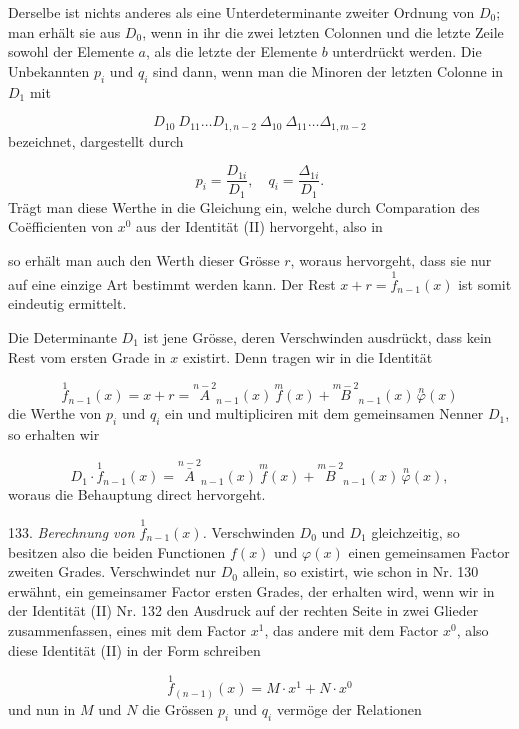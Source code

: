 Derselbe ist nichts anderes als eine Unterdeterminante zweiter Ordnung von $D_0$; man erhält sie aus $D_0$, wenn in ihr die zwei letzten Colonnen und die letzte Zeile sowohl der Elemente $a$, als die letzte der Elemente $b$ unterdrückt werden. Die Unbekannten $p_i$ und $q_i$ sind dann, wenn man die Minoren der letzten Colonne in $D_1$ mit

\[
D_{10}\ D_{11} \ldots D_{1,n-2}\ \Delta_{10}\ \Delta_{11} \ldots \Delta_{1,m-2}
\]
bezeichnet, dargestellt durch

\[
p_i = \frac{D_{1i}}{D_1},\quad q_i = \frac{\Delta_{1i}}{D_1}.
\]
Trägt man diese Werthe in die Gleichung ein, welche durch Comparation des Co\"efficienten von $x^0$ aus der Identität (II) hervorgeht, also in


so erhält man auch den Werth dieser Grösse $r$, woraus hervorgeht, dass sie nur auf eine einzige Art bestimmt werden kann. Der Rest $x + r = \overset{1}{f}_{n-1}(x)$ ist somit eindeutig ermittelt.



Die Determinante $D_1$ ist jene Grösse, deren Verschwinden ausdrückt, dass kein Rest vom ersten Grade in $x$ existirt. Denn tragen wir in die Identität

\[
\overset{1}{f}_{n-1}(x) = x + r = \overset{n-2}{A}_{n-1}(x)\,\overset{m}{f}(x) + \overset{m-2}{B}_{n-1}(x)\,\overset{n}{\varphi}(x)
\]
die Werthe von $p_i$ und $q_i$ ein und multipliciren mit dem gemeinsamen Nenner $D_1$, so erhalten wir

\[
D_1 \cdot \overset{1}{f}_{n-1}(x) = \overset{n-2}{\bar A}_{n-1}(x)\,\overset{m}{f}(x) + \overset{m-2}{B}_{n-1}(x)\,\overset{n}{\varphi}(x),
\]
woraus die Behauptung direct hervorgeht.

133. \textit{Berechnung von $\overset{1}{f}_{n-1}(x)$.} Verschwinden $D_0$ und $D_1$ gleichzeitig, so besitzen also die beiden Functionen $f(x)$ und $\varphi(x)$ einen gemeinsamen Factor zweiten Grades. Verschwindet nur $D_0$ allein, so existirt, wie schon in Nr. 130 erwähnt, ein gemeinsamer Factor ersten Grades, der erhalten wird, wenn wir in der Identität (II) Nr. 132 den Ausdruck auf der rechten Seite in zwei Glieder zusammenfassen, eines mit dem Factor $x^1$, das andere mit dem Factor $x^0$, also diese Identität (II) in der Form schreiben

\[
\overset{1}{f}_{(n-1)}(x) = M \cdot x^1 + N \cdot x^0
\]
und nun in $M$ und $N$ die Grössen $p_i$ und $q_i$ vermöge der Relationen

